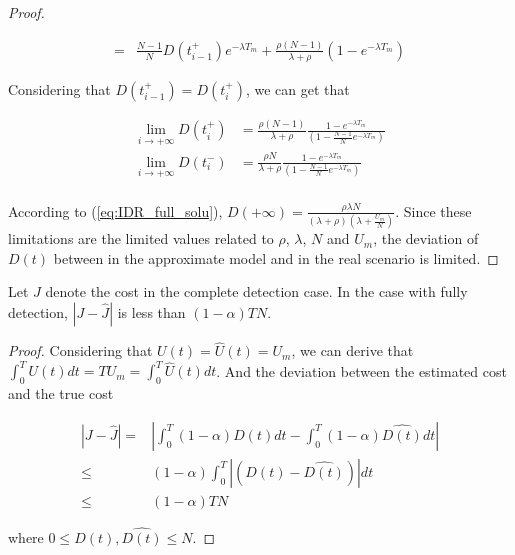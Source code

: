 \begin{proof}
\begin{small}
\begin{equation}
\begin{aligned}
=& \frac{N-1}{N} D(t_{i-1}^{+}) e^{-\lambda T_{m}}
+ \frac{\rho (N-1)}{\lambda + \rho} (1 - e^{-\lambda T_{m}})
\end{aligned}
\end{equation}
\end{small}
Considering that $D(t_{i-1}^{+}) = D(t_{i}^{+})$, we can get that
\begin{small}
\begin{equation}
\nonumber
\begin{aligned}
\lim_{i \rightarrow +\infty} D(t_{i}^{+}) &=
\frac{\rho(N-1)}{\lambda+\rho} \frac{1 - e^{-\lambda T_{m}}}
{(1 - \frac{N-1}{N}e^{-\lambda T_{m}})} \\
\lim_{i \rightarrow +\infty} D(t_{i}^{-}) &=
\frac{\rho N}{\lambda+\rho} \frac{1 - e^{-\lambda T_{m}}}
{(1 - \frac{N-1}{N}e^{-\lambda T_{m}})} \\
\end{aligned}
\end{equation}
\end{small}
According to (\ref{eq:IDR_full_solu}),
$D(+\infty) = \frac{\rho \lambda N}
{(\lambda + \rho)(\lambda + \frac{U_{m}}{N})}$.
Since these limitations are the limited values related to
$\rho$, $\lambda$, $N$ and $U_{m}$,
the deviation of $D(t)$ between in the approximate model and in the real scenario is limited.
\end{proof}

\begin{lem}
Let $J$ denote the cost in the complete detection case.
In the case with fully detection,
$|J - \hat{J}|$ is less than $(1-\alpha) T N$.
\end{lem}
\begin{proof}
Considering that $U(t) = \hat{U}(t) = U_{m}$,
we can derive that $\int_{0}^{T} U(t) dt = T U_{m} = \int_{0}^{T} \hat{U}(t) dt $.
And the deviation between the estimated cost and the true cost
\begin{small}
\begin{equation}
\label{eq:delta_J}
\begin{aligned}
|J - \hat{J}| = & \left| \int_{0}^{T} (1-\alpha)D(t) dt - \int_{0}^{T} (1-\alpha) \hat{D(t)} dt \right| \\
\le & (1-\alpha) \int_{0}^{T} |(D(t)-\hat{D(t)})| dt \\
\le & (1-\alpha) T N
\end{aligned}
\end{equation}
\end{small}
where $0 \le D(t), \hat{D(t)} \le N$.

\end{proof}

